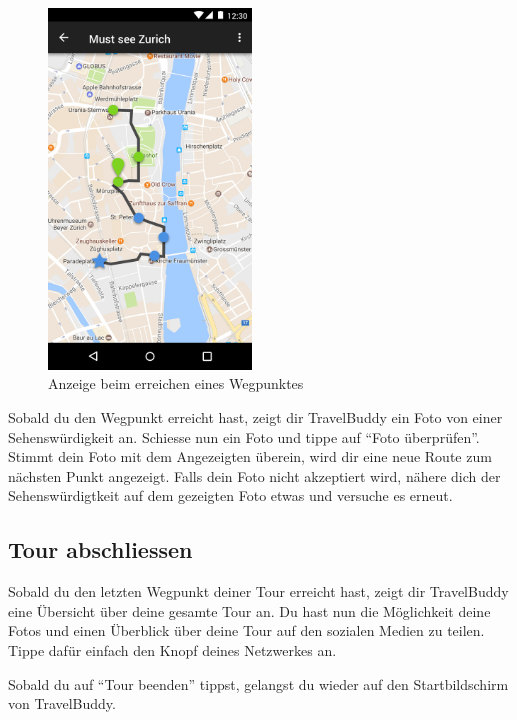 \documentclass[a4paper,10pt,xetex]{article}
\begin{document}
\begin{figure}
  \begin{center}
    \includegraphics[width=0.48\textwidth]{TourActivity}
    \caption{Anzeige beim erreichen eines Wegpunktes}
  \end{center}
\end{figure}

Sobald du den Wegpunkt erreicht hast, zeigt dir TravelBuddy ein Foto von einer
Sehenswürdigkeit an. Schiesse nun ein Foto und tippe auf ``Foto überprüfen''.
Stimmt dein Foto mit dem Angezeigten überein, wird dir eine neue Route zum nächsten Punkt
angezeigt. Falls dein Foto nicht akzeptiert wird, nähere dich der Sehenswürdigtkeit auf dem
gezeigten Foto etwas und versuche es erneut.


\newpage
\subsection{Tour abschliessen}
Sobald du den letzten Wegpunkt deiner Tour erreicht hast, zeigt dir TravelBuddy eine
Übersicht über deine gesamte Tour an. Du hast nun die Möglichkeit deine Fotos und einen
Überblick über deine Tour auf den sozialen Medien zu teilen. Tippe dafür einfach den
Knopf deines Netzwerkes an.

Sobald du auf ``Tour beenden'' tippst, gelangst du wieder auf den Startbildschirm von TravelBuddy.
\end{document}
